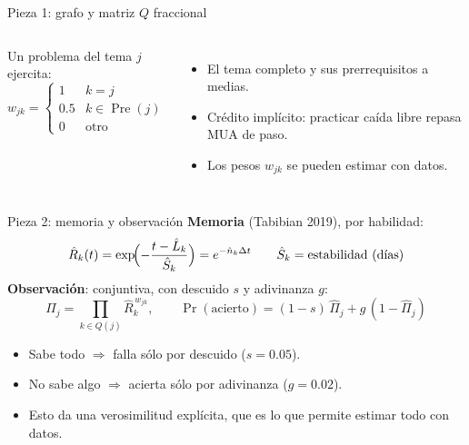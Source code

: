 \documentclass[aspectratio=169,11pt]{beamer}
\newcommand{\Rh}{\hat R}
\newcommand{\Sh}{\hat S}
\newcommand{\Pih}{\hat\Pi}
\newcommand{\Pre}{\operatorname{Pre}}
\begin{document}
\begin{frame}{Pieza 1: grafo y matriz $Q$ fraccional}
\small
\begin{columns}[T]
\centering
{}
Un problema del tema $j$ ejercita:
\[
w_{jk}=\begin{cases}1 & k=j\\ 0.5 & k\in\Pre(j)\\ 0 & \text{otro}\end{cases}
\]
\begin{itemize}
\item El tema completo y sus prerrequisitos \alert{a medias}.
\item Crédito implícito: practicar caída libre repasa MUA de paso.
\item Los pesos $w_{jk}$ se pueden estimar con datos.
\end{itemize}
\end{columns}
\end{frame}

\begin{frame}{Pieza 2: memoria y observación}
\textbf{Memoria} (Tabibian 2019), por habilidad:
\[
\Rh_k(t)=\exp\!\Bigl(-\frac{t-\hat L_k}{\Sh_k}\Bigr)=e^{-\hat n_k\Delta t}
\qquad \Sh_k=\text{estabilidad (días)}
\]
\textbf{Observación}: conjuntiva, con descuido $s$ y adivinanza $g$:
\[
\Pih_j=\prod_{k\in Q(j)}\Rh_k^{\,w_{jk}},\qquad
\Pr(\text{acierto})=(1-s)\,\Pih_j+g\,(1-\Pih_j)
\]
\begin{itemize}
\item Sabe todo $\Rightarrow$ falla sólo por descuido ($s=0.05$).
\item No sabe algo $\Rightarrow$ acierta sólo por adivinanza ($g=0.02$).
\item Esto da una \alert{verosimilitud explícita}, que es lo que permite estimar todo con datos.
\end{itemize}
\end{frame}
\end{document}
